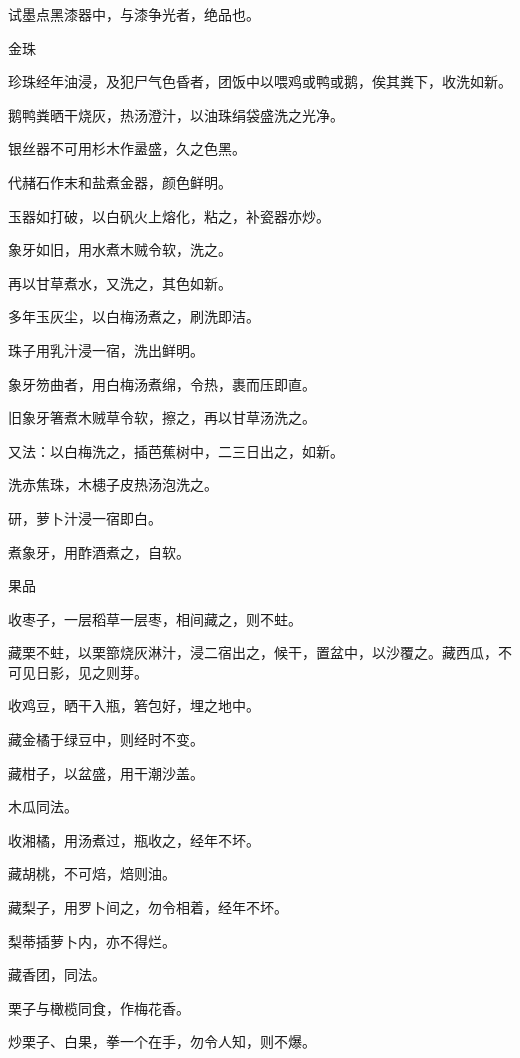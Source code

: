 \documentclass[a4paper,12pt,UTF8,twoside]{ctexbook}
\begin{document}
    试墨点黑漆器中，与漆争光者，绝品也。
    
    金珠
    
    珍珠经年油浸，及犯尸气色昏者，团饭中以喂鸡或鸭或鹅，俟其粪下，收洗如新。
    
    鹅鸭粪晒干烧灰，热汤澄汁，以油珠绢袋盛洗之光净。
    
    银丝器不可用杉木作盝盛，久之色黑。
    
    代赭石作末和盐煮金器，颜色鲜明。
    
    玉器如打破，以白矾火上熔化，粘之，补瓷器亦炒。
    
    象牙如旧，用水煮木贼令软，洗之。
    
    再以甘草煮水，又洗之，其色如新。
    
    多年玉灰尘，以白梅汤煮之，刷洗即洁。
    
    珠子用乳汁浸一宿，洗出鲜明。
    
    象牙笏曲者，用白梅汤煮绵，令热，裹而压即直。
    
    旧象牙箸煮木贼草令软，擦之，再以甘草汤洗之。
    
    又法：以白梅洗之，插芭蕉树中，二三日出之，如新。
    
    洗赤焦珠，木槵子皮热汤泡洗之。
    
    研，萝卜汁浸一宿即白。
    
    煮象牙，用酢酒煮之，自软。
    
    果品
    
    收枣子，一层稻草一层枣，相间藏之，则不蛀。
    
    藏栗不蛀，以栗篰烧灰淋汁，浸二宿出之，候干，置盆中，以沙覆之。藏西瓜，不可见日影，见之则芽。
    
    收鸡豆，晒干入瓶，箬包好，埋之地中。
    
    藏金橘于绿豆中，则经时不变。
    
    藏柑子，以盆盛，用干潮沙盖。
    
    木瓜同法。
    
    收湘橘，用汤煮过，瓶收之，经年不坏。
    
    藏胡桃，不可焙，焙则油。
    
    藏梨子，用罗卜间之，勿令相着，经年不坏。
    
    梨蒂插萝卜内，亦不得烂。
    
    藏香团，同法。
    
    栗子与橄榄同食，作梅花香。
    
    炒栗子、白果，拳一个在手，勿令人知，则不爆。
    
\end{document}

